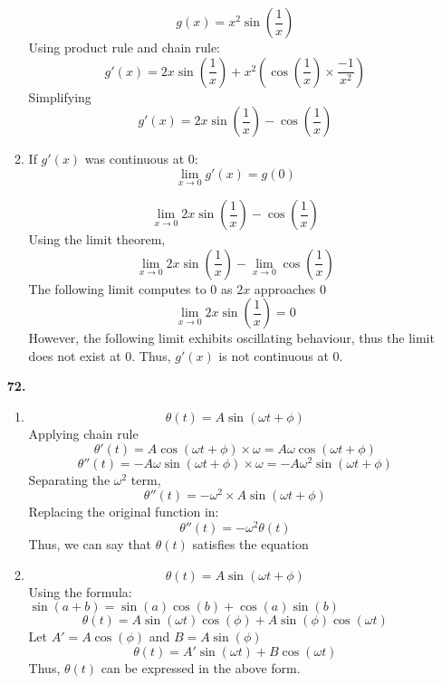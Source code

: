 \documentclass[12pt]{article}
\begin{document}
\begin{enumerate}[start=1,label={\bfseries. },leftmargin=1in]
\begin{enumerate}
        \[
        g(x) = x^2\sin\left(\frac{1}{x}\right)
        \]
        Using product rule and chain rule:
        \[
        g'(x) = 2x\sin\left(\frac{1}{x}\right) + x^2\left(\cos\left(\frac{1}{x}\right) \times \frac{-1}{x^2}\right)
        \]
        Simplifying
        \[
        g'(x) = 2x\sin\left(\frac{1}{x}\right) - \cos\left(\frac{1}{x}\right)
        \]
        \item 
        If $g'(x)$ was continuous at 0:
        \[
        \lim_{x\to0} g'(x) = g(0)
        \]

        \[
        \lim_{x \to 0}2x\sin\left(\frac{1}{x}\right)- \cos\left(\frac{1}{x}\right)
        \]
        Using the limit theorem, 
        \[
        \lim_{x\to0}2x\sin\left(\frac{1}{x}\right) - \lim_{x\to0}\cos\left(\frac{1}{x}\right)
        \]
        The following limit computes to 0 as $2x$ approaches 0
        \[
        \lim_{x\to0}2x\sin\left(\frac{1}{x}\right) = 0
        \]
        However, the following limit exhibits oscillating behaviour, thus the limit does not exist at 0. Thus, $g'(x)$ is not continuous at 0.
        
    \end{enumerate}

    \item [\textbf{72.}]
    \begin{enumerate}
        \item 
        \[
        \theta(t) = A \sin(\omega t+ \phi)
        \]
        Applying chain rule
        \[
        \theta'(t) = A \cos(\omega t + \phi) \times \omega = A\omega\cos(\omega t + \phi)
        \]
        \[
        \theta''(t) = -A\omega\sin(\omega t + \phi) \times \omega = -A\omega^2\sin(\omega t + \phi)
        \]
        Separating the $\omega^2$ term,
        \[
        \theta''(t) = -\omega^2 \times A \sin(\omega t+ \phi)
        \]
        Replacing the original function in:
        \[
        \theta''(t) = -\omega^2 \theta(t)
        \]
        Thus, we can say that $\theta(t)$ satisfies the equation
        \bigbreak
        \item 
        \[
        \theta(t) = A\sin(\omega t+\phi)
        \]
        Using the formula: $\sin(a+b) = \sin(a)\cos(b) + \cos(a)\sin(b)$
        \[
        \theta(t) = A\sin(\omega t)\cos(\phi) + A\sin(\phi)\cos(\omega t)
        \]
        Let $A' = A\cos(\phi)$ and $B = A\sin(\phi)$
        \[
        \theta(t) = A'\sin(\omega t) + B\cos(\omega t)
        \]
        Thus, $\theta(t)$ can be expressed in the above form.
    \end{enumerate}
\end{enumerate}
\end{document}
